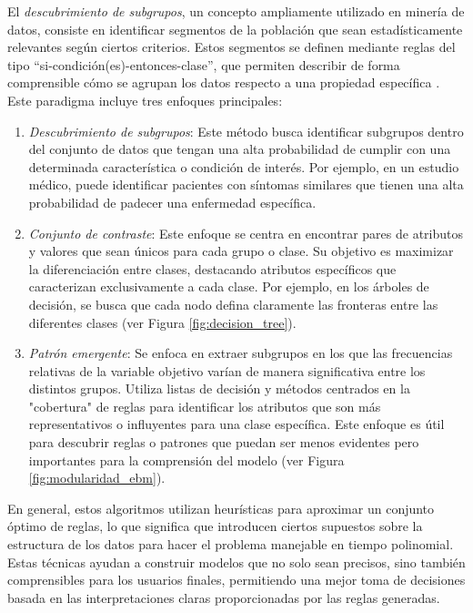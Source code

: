 El \textit{descubrimiento de subgrupos}, un concepto ampliamente utilizado en minería de datos, consiste en identificar segmentos de la población que sean estadísticamente relevantes según ciertos criterios. Estos segmentos se definen mediante reglas del tipo “si-condición(es)-entonces-clase”, que permiten describir de forma comprensible cómo se agrupan los datos respecto a una propiedad específica \cite{Wrobel-2001, Herrera-2010}. Este paradigma incluye tres enfoques principales:

\begin{enumerate}
    \item \textit{Descubrimiento de subgrupos}: Este método busca identificar subgrupos dentro del conjunto de datos que tengan una alta probabilidad de cumplir con una determinada característica o condición de interés. Por ejemplo, en un estudio médico, puede identificar pacientes con síntomas similares que tienen una alta probabilidad de padecer una enfermedad específica.

    \item \textit{Conjunto de contraste}: Este enfoque se centra en encontrar pares de atributos y valores que sean únicos para cada grupo o clase. Su objetivo es maximizar la diferenciación entre clases, destacando atributos específicos que caracterizan exclusivamente a cada clase. Por ejemplo, en los árboles de decisión, se busca que cada nodo defina claramente las fronteras entre las diferentes clases (ver Figura \ref{fig:decision_tree}).

    \item \textit{Patrón emergente}: Se enfoca en extraer subgrupos en los que las frecuencias relativas de la variable objetivo varían de manera significativa entre los distintos grupos. Utiliza listas de decisión y métodos centrados en la "cobertura" de reglas para identificar los atributos que son más representativos o influyentes para una clase específica. Este enfoque es útil para descubrir reglas o patrones que puedan ser menos evidentes pero importantes para la comprensión del modelo (ver Figura \ref{fig:modularidad_ebm}).
\end{enumerate}

En general, estos algoritmos utilizan heurísticas para aproximar un conjunto óptimo de reglas, lo que significa que introducen ciertos supuestos sobre la estructura de los datos para hacer el problema manejable en tiempo polinomial. Estas técnicas ayudan a construir modelos que no solo sean precisos, sino también comprensibles para los usuarios finales, permitiendo una mejor toma de decisiones basada en las interpretaciones claras proporcionadas por las reglas generadas.

